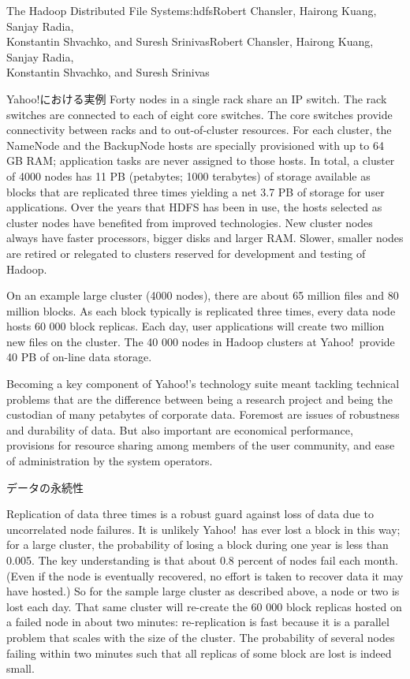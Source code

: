\begin{aosachaptertoc}{The Hadoop Distributed File System}{s:hdfs}{Robert Chansler, Hairong Kuang, Sanjay Radia, \\ Konstantin Shvachko, and Suresh Srinivas}{Robert Chansler, Hairong Kuang, Sanjay Radia, \\ \hspace*{0.9cm} Konstantin Shvachko, and Suresh Srinivas}
\begin{aosasect1}{Yahoo!における実例}
Forty nodes in a single rack share an IP switch. The rack switches are
connected to each of eight core switches. The core switches provide
connectivity between racks and to out-of-cluster resources. For each
cluster, the NameNode and the BackupNode hosts are specially
provisioned with up to 64 GB RAM; application tasks are never assigned
to those hosts. In total, a cluster of 4000 nodes has 11 PB
(petabytes; 1000 terabytes) of storage available as blocks that are
replicated three times yielding a net 3.7 PB of storage for user
applications. Over the years that HDFS has been in use, the hosts
selected as cluster nodes have benefited from improved
technologies. New cluster nodes always have faster processors, bigger
disks and larger RAM\@. Slower, smaller nodes are retired or relegated
to clusters reserved for development and testing of Hadoop.

On an example large cluster (4000 nodes), there are about 65 million
files and 80 million blocks. As each block typically is replicated
three times, every data node hosts 60 000 block replicas. Each day,
user applications will create two million new files on the
cluster. The 40 000 nodes in Hadoop clusters at Yahoo!\ provide 40 PB
of on-line data storage.

Becoming a key component of Yahoo!'s technology suite meant tackling
technical problems that are the difference between being a research
project and being the custodian of many petabytes of corporate data.
Foremost are issues of robustness and durability of data. But also
important are economical performance, provisions for resource sharing
among members of the user community, and ease of administration by the
system operators.

\begin{aosasect2}{データの永続性}

Replication of data three times is a robust guard against loss of data
due to uncorrelated node failures. It is unlikely Yahoo!\ has ever lost
a block in this way; for a large cluster, the probability of losing a
block during one year is less than 0.005. The key understanding is
that about 0.8 percent of nodes fail each month. (Even if the node is
eventually recovered, no effort is taken to recover data it may have
hosted.) So for the sample large cluster as described above, a node or
two is lost each day. That same cluster will re-create the 60 000
block replicas hosted on a failed node in about two
minutes: re-replication is fast because it is a parallel problem that
scales with the size of the cluster. The probability of several nodes
failing within two minutes such that all replicas of some block are
lost is indeed small.


\end{aosasect2}
\end{aosasect1}
\end{aosachaptertoc}
